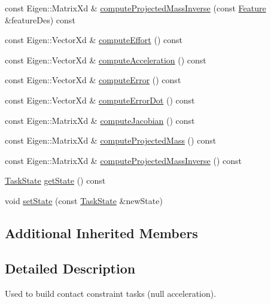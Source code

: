 \begin{DoxyCompactItemize}
\item 
const Eigen\+::\+Matrix\+Xd \& \hyperlink{classocra_1_1ContactConstraintFeature_a9bdfabb746abff207ff9cc3e9c968c81}{compute\+Projected\+Mass\+Inverse} (const \hyperlink{classocra_1_1Feature}{Feature} \&feature\+Des) const
\item 
const Eigen\+::\+Vector\+Xd \& \hyperlink{classocra_1_1ContactConstraintFeature_a84b467c5da2810bef8a76525e617ad2d}{compute\+Effort} () const
\item 
const Eigen\+::\+Vector\+Xd \& \hyperlink{classocra_1_1ContactConstraintFeature_a8537fa220270cf526014f0c4f5e6ea75}{compute\+Acceleration} () const
\item 
const Eigen\+::\+Vector\+Xd \& \hyperlink{classocra_1_1ContactConstraintFeature_ae846fba34c59502db6cf0a0dac0e6be3}{compute\+Error} () const
\item 
const Eigen\+::\+Vector\+Xd \& \hyperlink{classocra_1_1ContactConstraintFeature_afbe828f952c7583b690e394efd05423f}{compute\+Error\+Dot} () const
\item 
const Eigen\+::\+Matrix\+Xd \& \hyperlink{classocra_1_1ContactConstraintFeature_aa3c6131d9c4c815e9e9ec5ab50407b21}{compute\+Jacobian} () const
\item 
const Eigen\+::\+Matrix\+Xd \& \hyperlink{classocra_1_1ContactConstraintFeature_ab926340d6c6d00b1358ae99432e15398}{compute\+Projected\+Mass} () const
\item 
const Eigen\+::\+Matrix\+Xd \& \hyperlink{classocra_1_1ContactConstraintFeature_a78ba3452b7ad08dae7a266b0334aaa5d}{compute\+Projected\+Mass\+Inverse} () const
\item 
\hyperlink{classocra_1_1TaskState}{Task\+State} \hyperlink{classocra_1_1ContactConstraintFeature_a4a156de21fba41f54c2927232173d334}{get\+State} () const
\item 
void \hyperlink{classocra_1_1ContactConstraintFeature_a1bbc7ca568a64aed7704118b8eeaf6d1}{set\+State} (const \hyperlink{classocra_1_1TaskState}{Task\+State} \&new\+State)
\end{DoxyCompactItemize}
\subsection*{Additional Inherited Members}


\subsection{Detailed Description}
Used to build contact constraint tasks (null acceleration). 

